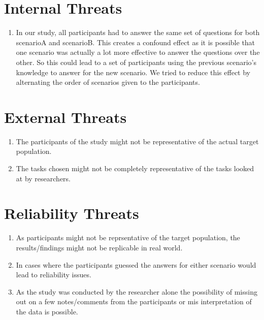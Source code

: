 \documentclass[seploa]{beavtex}
\begin{document}
\section{Internal Threats}
\begin{enumerate}
\item In our study, all participants had to answer the same set of questions for both scenarioA and scenarioB. This creates a confound effect as it is possible that one scenario was actually a lot more effective to answer the questions over the other. So this could lead to a set of participants using the previous scenario's knowledge to answer for the new scenario. We tried to reduce this effect by alternating the order of scenarios given to the participants.
\end{enumerate}

\section{External Threats}
\begin{enumerate}
\item The participants of the study might not be representative of the actual target population.
\item The tasks chosen might not be completely representative of the tasks looked at by researchers.
\end{enumerate}

\section{Reliability Threats}
\begin{enumerate}
\item As participants might not be reprsentative of the target population, the results/findings might not be replicable in real world.
\item In cases where the participants guessed the answers for either scenario would lead to reliability issues.
\item As the study was conducted by the researcher alone the possibility of missing out on a few notes/comments from the participants or mis interpretation of the data is possible.
\end{enumerate}
\end{document}
